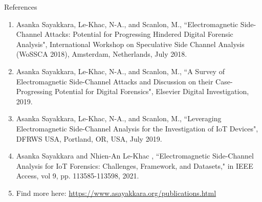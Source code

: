 \documentclass[handout]{beamer}
\begin{document}
\begin{frame}{References}

\begin{enumerate}
\scriptsize
\item Asanka Sayakkara, Le-Khac, N-A., and Scanlon, M., ``Electromagnetic Side-Channel Attacks: Potential for Progressing Hindered Digital Forensic Analysis", International Workshop on Speculative Side Channel Analysis (WoSSCA 2018), Amsterdam, Netherlands, July 2018.
\vspace{10pt}
\item Asanka Sayakkara, Le-Khac, N-A., and Scanlon, M., ``A Survey of Electromagnetic Side-Channel Attacks and Discussion on their Case-Progressing Potential for Digital Forensics", Elsevier Digital Investigation, 2019. 
\vspace{10pt}
\item Asanka Sayakkara, Le-Khac, N-A., and Scanlon, M., ``Leveraging Electromagnetic Side-Channel Analysis for the Investigation of IoT Devices", DFRWS USA, Portland, OR, USA, July 2019.
\vspace{10pt}
\item Asanka Sayakkara and Nhien-An Le-Khac , ``Electromagnetic Side-Channel Analysis for IoT Forensics: Challenges, Framework, and Datasets," in IEEE Access, vol 9, pp. 113585-113598, 2021. 
\vspace{10pt}
\item[] Find more here: \url{https://www.asayakkara.org/publications.html}
\end{enumerate}

\end{frame}
\end{document}
